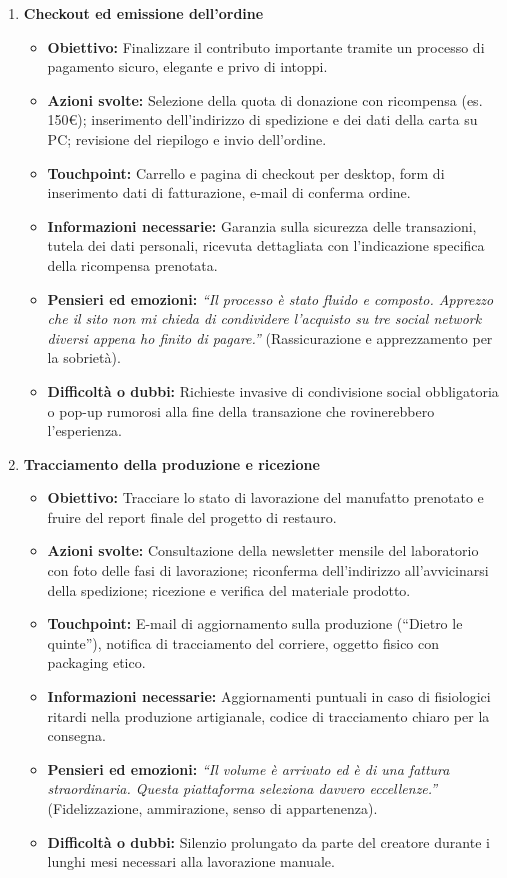 \documentclass[11pt,a4paper]{article}
\begin{document}
\begin{enumerate}
        \item \textbf{Checkout ed emissione dell'ordine}
        \begin{itemize}
            \item \textbf{Obiettivo:} Finalizzare il contributo importante tramite un processo di pagamento sicuro, elegante e privo di intoppi.
            \item \textbf{Azioni svolte:} Selezione della quota di donazione con ricompensa (es. 150€); inserimento dell'indirizzo di spedizione e dei dati della carta su PC; revisione del riepilogo e invio dell'ordine.
            \item \textbf{Touchpoint:} Carrello e pagina di checkout per desktop, form di inserimento dati di fatturazione, e-mail di conferma ordine.
            \item \textbf{Informazioni necessarie:} Garanzia sulla sicurezza delle transazioni, tutela dei dati personali, ricevuta dettagliata con l'indicazione specifica della ricompensa prenotata.
            \item \textbf{Pensieri ed emozioni:} \textit{``Il processo è stato fluido e composto. Apprezzo che il sito non mi chieda di condividere l'acquisto su tre social network diversi appena ho finito di pagare.''} (Rassicurazione e apprezzamento per la sobrietà).
            \item \textbf{Difficoltà o dubbi:} Richieste invasive di condivisione social obbligatoria o pop-up rumorosi alla fine della transazione che rovinerebbero l’esperienza.
        \end{itemize}

        \item \textbf{Tracciamento della produzione e ricezione}
        \begin{itemize}
            \item \textbf{Obiettivo:} Tracciare lo stato di lavorazione del manufatto prenotato e fruire del report finale del progetto di restauro.
            \item \textbf{Azioni svolte:} Consultazione della newsletter mensile del laboratorio con foto delle fasi di lavorazione; riconferma dell'indirizzo all'avvicinarsi della spedizione; ricezione e verifica del materiale prodotto.
            \item \textbf{Touchpoint:} E-mail di aggiornamento sulla produzione (``Dietro le quinte''), notifica di tracciamento del corriere, oggetto fisico con packaging etico.
            \item \textbf{Informazioni necessarie:} Aggiornamenti puntuali in caso di fisiologici ritardi nella produzione artigianale, codice di tracciamento chiaro per la consegna.
            \item \textbf{Pensieri ed emozioni:} \textit{``Il volume è arrivato ed è di una fattura straordinaria. Questa piattaforma seleziona davvero eccellenze.''} (Fidelizzazione, ammirazione, senso di appartenenza).
            \item \textbf{Difficoltà o dubbi:} Silenzio prolungato da parte del creatore durante i lunghi mesi necessari alla lavorazione manuale.
        \end{itemize}


\end{enumerate}
\end{document}
